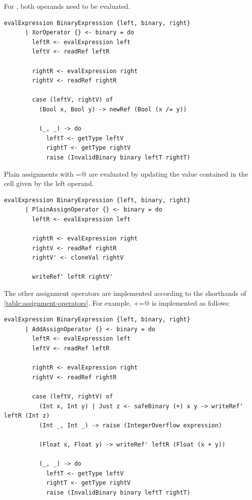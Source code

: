 \documentclass[UdineBachThesis,american,11pt]{PhdThesis}
\begin{document}
  \newpage

  For \lstinline@xor@, both operands need to be evaluated.

  \begin{lstlisting}[gobble=4,basicstyle=\ttfamily\small]
    evalExpression BinaryExpression {left, binary, right}
      | XorOperator {} <- binary = do
        leftR <- evalExpression left
        leftV <- readRef leftR

        rightR <- evalExpression right
        rightV <- readRef rightR

        case (leftV, rightV) of
          (Bool x, Bool y) -> newRef (Bool (x /= y))

          (_, _) -> do
            leftT <- getType leftV
            rightT <- getType rightV
            raise (InvalidBinary binary leftT rightT)
  \end{lstlisting}

  Plain assignments with \lstinline@=@ are evaluated by updating the value
  contained in the cell given by the left operand.

  \begin{lstlisting}[gobble=4,basicstyle=\ttfamily\small]
    evalExpression BinaryExpression {left, binary, right}
      | PlainAssignOperator {} <- binary = do
        leftR <- evalExpression left

        rightR <- evalExpression right
        rightV <- readRef rightR
        rightV' <- cloneVal rightV

        writeRef' leftR rightV'
  \end{lstlisting}

  The other assignment operators are implemented according to the shorthands of
  \autoref{table:assignment-operators}. For example, \lstinline@+=@ is
  implemented as follows:

  \begin{lstlisting}[gobble=4,basicstyle=\ttfamily\small]
    evalExpression BinaryExpression {left, binary, right}
      | AddAssignOperator {} <- binary = do
        leftR <- evalExpression left
        leftV <- readRef leftR

        rightR <- evalExpression right
        rightV <- readRef rightR

        case (leftV, rightV) of
          (Int x, Int y) | Just z <- safeBinary (+) x y -> writeRef' leftR (Int z)
          (Int _, Int _) -> raise (IntegerOverflow expression)

          (Float x, Float y) -> writeRef' leftR (Float (x + y))

          (_, _) -> do
            leftT <- getType leftV
            rightT <- getType rightV
            raise (InvalidBinary binary leftT rightT)
  \end{lstlisting}
\end{document}
